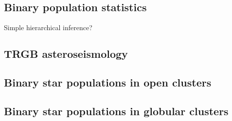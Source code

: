 \documentclass[modern]{aastex62}
\begin{document}
\subsection{Binary population statistics}
Simple hierarchical inference?

\subsection{TRGB asteroseismology}

\subsection{Binary star populations in open clusters}

\subsection{Binary star populations in globular clusters}





\end{document}
